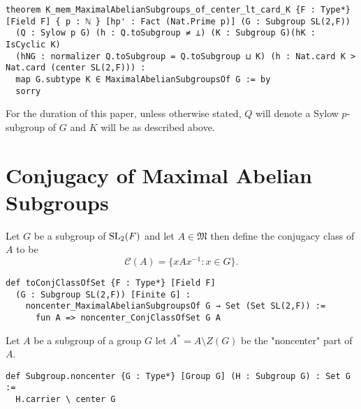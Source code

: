 \begin{footnotesize}
\begin{verbatim}
theorem K_mem_MaximalAbelianSubgroups_of_center_lt_card_K {F : Type*} [Field F] { p : ℕ } [hp' : Fact (Nat.Prime p)] (G : Subgroup SL(2,F))
  (Q : Sylow p G) (h : Q.toSubgroup ≠ ⊥) (K : Subgroup G)(hK : IsCyclic K)
  (hNG : normalizer Q.toSubgroup = Q.toSubgroup ⊔ K) (h : Nat.card K > Nat.card (center SL(2,F))) :
  map G.subtype K ∈ MaximalAbelianSubgroupsOf G := by
  sorry
\end{verbatim}
\end{footnotesize}

For the duration of this paper, unless otherwise stated, $Q$ will denote a Sylow $p$-subgroup of $G$ and $K$ will be as described above. 


\section{Conjugacy of Maximal Abelian Subgroups}

\begin{definition}
  \label{ConjClassOfSet}
  \leanok
  Let $G$ be a subgroup of $\operatorname{SL}_2(F)$ and let $A \in \mathfrak{M}$ then define the conjugacy class of $A$ to be 
  \[
  \mathcal{C}(A) = \{ x A x^{-1} : x \in G \}.
  \]
\end{definition}
\begin{footnotesize}
\begin{verbatim}
def toConjClassOfSet {F : Type*} [Field F]
  (G : Subgroup SL(2,F)) [Finite G] : 
    noncenter_MaximalAbelianSubgroupsOf G → Set (Set SL(2,F)) :=
      fun A => noncenter_ConjClassOfSet G A
\end{verbatim}
\end{footnotesize}

\begin{definition}
  \label{Subgroup.noncenter}
  \leanok
  Let $A$ be a subgroup of a group $G$ let $A^* = A \setminus Z(G)$ be the "noncenter" part of $A$.
\end{definition}
\begin{footnotesize}
\begin{verbatim}
def Subgroup.noncenter {G : Type*} [Group G] (H : Subgroup G) : Set G :=
  H.carrier \ center G
\end{verbatim}
\end{footnotesize}

